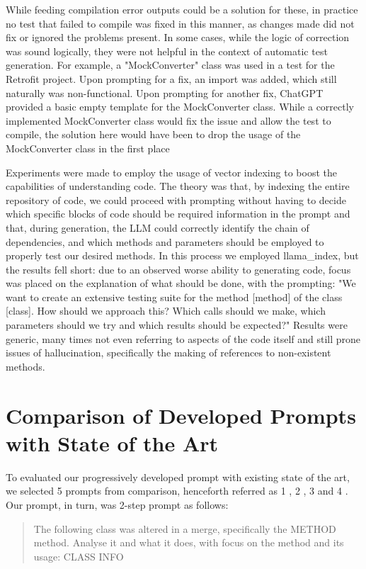 While feeding compilation error outputs could be a solution for these, in practice no test that failed to compile was fixed in this manner, as changes made did not fix or ignored the problems present. In some cases, while the logic of correction was sound logically, they were not helpful in the context of automatic test generation. For example, a "MockConverter" class was used in a test for the Retrofit project. Upon prompting for a fix, an import was added, which still naturally was non-functional. Upon prompting for another fix, ChatGPT provided a basic empty template for the MockConverter class. While a correctly implemented MockConverter class would fix the issue and allow the test to compile, the solution here would have been to drop the usage of the MockConverter class in the first place

Experiments were made to employ the usage of vector indexing to boost the capabilities of understanding code. The theory was that, by indexing the entire repository of code, we could proceed with prompting without having to decide which specific blocks of code should be required information in the prompt and that, during generation, the LLM could correctly identify the chain of dependencies, and which methods and parameters should be employed to properly test our desired methods. In this process we employed llama\_index, but the results fell short: due to an observed worse ability to generating code, focus was placed on the explanation of what should be done, with the prompting: "We want to create an extensive testing suite for the method [method] of the class [class]. How should we approach this? Which calls should we make, which parameters should we try and which results should be expected?"
Results were generic, many times not even referring to aspects of the code itself and still prone issues of hallucination, specifically the making of references to non-existent methods.

\section{Comparison of Developed Prompts with State of the Art}

To evaluated our progressively developed prompt with existing state of the art, we selected 5 prompts from comparison, henceforth referred as 1 \cite{kn:chattester}, 2 \cite{kn:siddiq2023empirical}, 3 \cite{kn:gptunitbra} and 4 \cite{kn:chatunitest}. Our prompt, in turn, was 2-step prompt as follows:

\begin{quote}
The following class was altered in a merge, specifically the METHOD method. Analyse it and what it does, with focus on the method and its usage: CLASS INFO
\end{quote}

